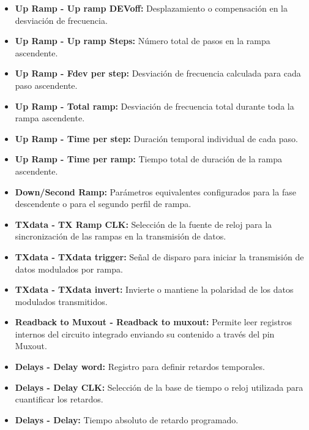 \begin{itemize}
    \item \textbf{Up Ramp - Up ramp DEVoff:} Desplazamiento o compensación en la desviación de frecuencia.
    
    \item \textbf{Up Ramp - Up ramp Steps:} Número total de pasos en la rampa ascendente.
    
    \item \textbf{Up Ramp - Fdev per step:} Desviación de frecuencia calculada para cada paso ascendente.
    
    \item \textbf{Up Ramp - Total ramp:} Desviación de frecuencia total durante toda la rampa ascendente.
    
    \item \textbf{Up Ramp - Time per step:} Duración temporal individual de cada paso.
    
    \item \textbf{Up Ramp - Time per ramp:} Tiempo total de duración de la rampa ascendente.
    
    \item \textbf{Down/Second Ramp:} Parámetros equivalentes configurados para la fase descendente o para el segundo perfil de rampa.
    
    \item \textbf{TXdata - TX Ramp CLK:} Selección de la fuente de reloj para la sincronización de las rampas en la transmisión de datos.
    
    \item \textbf{TXdata - TXdata trigger:} Señal de disparo para iniciar la transmisión de datos modulados por rampa.
    
    \item \textbf{TXdata - TXdata invert:} Invierte o mantiene la polaridad de los datos modulados transmitidos.
    
    \item \textbf{Readback to Muxout - Readback to muxout:} Permite leer registros internos del circuito integrado enviando su contenido a través del pin Muxout.
    
    \item \textbf{Delays - Delay word:} Registro para definir retardos temporales.
    
    \item \textbf{Delays - Delay CLK:} Selección de la base de tiempo o reloj utilizada para cuantificar los retardos.
    
    \item \textbf{Delays - Delay:} Tiempo absoluto de retardo programado.
    

\end{itemize}
